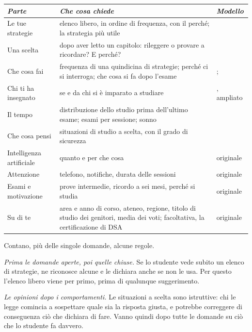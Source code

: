 \begin{table}[tbp]\small
  \centering
  \begin{tabular}{@{}>{\raggedright\arraybackslash}p{}>{\raggedright\arraybackslash}p{}>{\raggedright\arraybackslash}p{}@{}}
    \toprule
    \textit{Parte} & \textit{Che cosa chiede} & \textit{Modello} \\
    \midrule
    Le tue strategie & elenco libero, in ordine di frequenza, con il perché; la strategia più utile & \textcite{karpicke2009} \\
    Una scelta & dopo aver letto un capitolo: rileggere o provare a ricordare? E perché? & \textcite{karpicke2009} \\
    Che cosa fai & frequenza di una quindicina di strategie; perché ci si interroga; che cosa si fa dopo l'esame & \textcite{kornell2007}; \textcite{hartwig2012} \\
    Chi ti ha insegnato & se e da chi si è imparato a studiare & \textcite{kornell2007}, ampliato \\
    Il tempo & distribuzione dello studio prima dell'ultimo esame; esami per sessione; sonno & \textcite{hartwig2012} \\
    Che cosa pensi & situazioni di studio a scelta, con il grado di sicurezza & \textcite{mccabe2011} \\
    Intelligenza artificiale & quanto e per che cosa & originale \\
    Attenzione & telefono, notifiche, durata delle sessioni & originale \\
    Esami e motivazione & prove intermedie, ricordo a sei mesi, perché si studia & originale \\
    Su di te & area e anno di corso, ateneo, regione, titolo di studio dei genitori, media dei voti; facoltativa, la certificazione di DSA & originale \\
    \bottomrule
  \end{tabular}
\end{table}

Contano, più delle singole domande, alcune regole.

\emph{Prima le domande aperte, poi quelle chiuse.} Se lo studente vede
subito un elenco di strategie, ne riconosce alcune e le dichiara anche
se non le usa. Per questo l'elenco libero viene per primo, prima di
qualunque suggerimento.

\emph{Le opinioni dopo i comportamenti.} Le situazioni a scelta sono
istruttive: chi le legge comincia a sospettare quale sia la risposta
giusta, e potrebbe correggere di conseguenza ciò che dichiara di fare.
Vanno quindi dopo tutte le domande su ciò che lo studente fa davvero.

